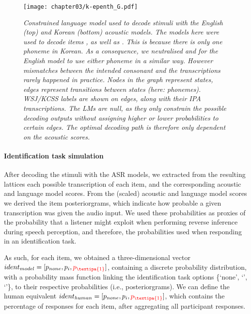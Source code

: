 {\begin{figure}[htb]
    \centering
    \texttt{[image: chapter03/k-epenth\_G.pdf]}
    \caption{\textit{Constrained language model used to decode stimuli with the English (top) and Korean (bottom) acoustic models. The models here were used to decode items , as well as . This is because there is only one  phoneme in Korean. As a consequence, we neutralised  and  for the English model to use either phoneme in a similar way. However mismatches between the intended consonant and the transcriptions rarely happened in practice. Nodes in the graph represent states, edges represent transitions between states (here: phonemes). WSJ/KCSS labels are shown on edges, along with their IPA transcriptions. The LMs are null, as they only constrain the possible decoding outputs without assigning higher or lower probabilities to certain edges. The optimal decoding path is therefore only dependent on the acoustic scores.}}
    \label{fig:k-epenth_G}
  \end{figure}
  
\paragraph{Identification task simulation}
After decoding the stimuli with the ASR models, we extracted from the resulting lattices each possible transcription of each item, and the corresponding acoustic and language model scores. %
From the (scaled) acoustic and language model scores we derived the item posteriorgrams, which indicate how probable a given transcription was given the audio input. We used these probabilities as proxies of the probability that a listener might exploit when performing reverse inference during speech perception, and therefore, the probabilities used when responding in an identification task. 

As such, for each item, we obtained a three-dimensional vector $ident_{model} = [p_{none}, p_{i}, {\color{red}p_{\textipa{1}}}]$, containing a discrete probability distribution, with a probability mass function linking the identification task options \{`none', `', `'\}, to their respective probabilities (i.e., posteriorgrams).
We can define the human equivalent $ident_{human} = [p_{none}, p_{i}, {\color{red}p_{\textipa{1}}}]$, which contains the percentage of responses for each item, after aggregating all participant responses.

}
